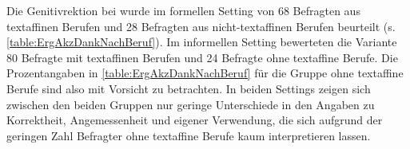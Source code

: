 Die Genitivrektion bei \dank{} wurde im formellen Setting von 68 Befragten aus textaffinen Berufen und 28 Befragten aus nicht-textaffinen Berufen beurteilt (s. \autoref{table:ErgAkzDankNachBeruf}). 
Im informellen Setting bewerteten die Variante 80 Befragte mit textaffinen Berufen und 24 Befragte ohne textaffine Berufe.
Die Prozentangaben in \autoref{table:ErgAkzDankNachBeruf} für die Gruppe ohne textaffine Berufe sind also mit Vorsicht zu betrachten.  In beiden Settings zeigen sich zwischen den beiden Gruppen nur geringe Unterschiede in den Angaben zu Korrektheit, Angemessenheit und eigener Verwendung, die sich aufgrund der geringen Zahl Befragter ohne textaffine Berufe kaum interpretieren lassen.

